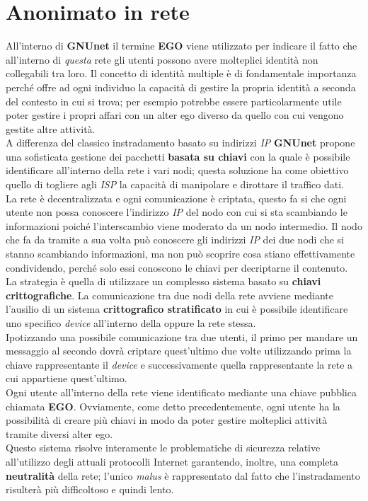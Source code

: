 \chapter{Anonimato in rete}
All'interno di \textbf{GNUnet} il termine \textbf{EGO} viene utilizzato per indicare il fatto che all'interno di \emph{questa} rete gli utenti possono avere molteplici identità non collegabili tra loro. Il concetto di identità multiple è di fondamentale importanza perché offre ad ogni individuo la capacità di gestire la propria identità a seconda del contesto in cui si trova; per esempio potrebbe essere particolarmente utile poter gestire i propri affari con un alter ego diverso da quello con cui vengono gestite altre attività. \\
A differenza del classico instradamento basato su indirizzi \textit{IP} \textbf{GNUnet} propone una sofisticata gestione dei pacchetti \textbf{basata su chiavi} con la quale è possibile identificare all'interno della rete i vari nodi; questa soluzione ha come obiettivo quello di togliere agli \textit{ISP} la capacità di manipolare e dirottare il traffico dati. \\
La rete è decentralizzata e ogni comunicazione è criptata, questo fa si che ogni utente non possa conoscere l'indirizzo \textit{IP} del nodo con cui si sta scambiando le informazioni poiché l'interscambio viene moderato da un nodo intermedio. Il nodo che fa da tramite a sua volta può conoscere gli indirizzi \textit{IP} dei due nodi che si stanno scambiando informazioni, ma non può scoprire cosa stiano effettivamente condividendo, perché solo essi conoscono le chiavi per decriptarne il contenuto. \\
La strategia è quella di utilizzare un complesso sistema basato su \textbf{chiavi crittografiche}.
La comunicazione tra due nodi della rete avviene mediante l'ausilio di un sistema \textbf{crittografico stratificato} in cui è possibile identificare uno specifico \textit{device} all'interno della oppure la rete stessa.\\
Ipotizzando una possibile comunicazione tra due utenti, il primo per mandare un messaggio al secondo dovrà criptare quest'ultimo due volte utilizzando prima la chiave rappresentante il \textit{device} e successivamente quella rappresentante la rete a cui appartiene quest'ultimo.\\
Ogni utente all'interno della rete viene identificato mediante una chiave pubblica chiamata \textbf{EGO}. Ovviamente, come detto precedentemente, ogni utente ha la possibilità di creare più chiavi in modo da poter gestire molteplici attività tramite diversi alter ego. \\
Questo sistema risolve interamente le problematiche di sicurezza relative all'utilizzo degli attuali protocolli Internet garantendo, inoltre, una completa \textbf{neutralità} della rete; l'unico \textit{malus} è rappresentato dal fatto che l'instradamento risulterà più difficoltoso e quindi lento.


